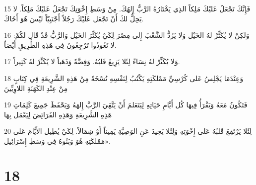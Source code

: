 \par 15 فَإِنَّكَ تَجْعَلُ عَليْكَ مَلِكاً الذِي يَخْتَارُهُ الرَّبُّ إِلهُكَ. مِنْ وَسَطِ إِخْوَتِكَ تَجْعَلُ عَليْكَ مَلِكاً. لا يَحِلُّ لكَ أَنْ تَجْعَل عَليْكَ رَجُلاً أَجْنَبِيّاً ليْسَ هُوَ أَخَاكَ.
\par 16 وَلكِنْ لا يُكَثِّرْ لهُ الخَيْل وَلا يَرُدُّ الشَّعْبَ إِلى مِصْرَ لِكَيْ يُكَثِّرَ الخَيْل وَالرَّبُّ قَدْ قَال لكُمْ: لا تَعُودُوا تَرْجِعُونَ فِي هَذِهِ الطَّرِيقِ أَيْضاً.
\par 17 وَلا يُكَثِّرْ لهُ نِسَاءً لِئَلا يَزِيغَ قَلبُهُ. وَفِضَّةً وَذَهَباً لا يُكَثِّرْ لهُ كَثِيراً.
\par 18 وَعِنْدَمَا يَجْلِسُ عَلى كُرْسِيِّ مَمْلكَتِهِ يَكْتُبُ لِنَفْسِهِ نُسْخَةً مِنْ هَذِهِ الشَّرِيعَةِ فِي كِتَابٍ مِنْ عِنْدِ الكَهَنَةِ اللاوِيِّينَ
\par 19 فَتَكُونُ مَعَهُ وَيَقْرَأُ فِيهَا كُل أَيَّامِ حَيَاتِهِ لِيَتَعَلمَ أَنْ يَتَّقِيَ الرَّبَّ إِلهَهُ وَيَحْفَظَ جَمِيعَ كَلِمَاتِ هَذِهِ الشَّرِيعَةِ وَهَذِهِ الفَرَائِضَ لِيَعْمَل بِهَا
\par 20 لِئَلا يَرْتَفِعَ قَلبُهُ عَلى إِخْوَتِهِ وَلِئَلا يَحِيدَ عَنِ الوَصِيَّةِ يَمِيناً أَوْ شِمَالاً. لِكَيْ يُطِيل الأَيَّامَ عَلى مَمْلكَتِهِ هُوَ وَبَنُوهُ فِي وَسَطِ إِسْرَائِيل».

\chapter{18}

